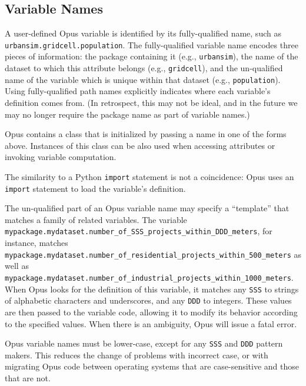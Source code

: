 {\subsection{Variable Names}
\label{sec:variable-names}
\variablesindex

A user-defined Opus variable \variablesindex is identified by its
fully-qualified name, such as \verb|urbansim.gridcell.population|.  The
fully-qualified variable \variablesindex name encodes three pieces of
information: the package containing it (e.g., \verb|urbansim|), the name of
the dataset \datasetindex to which this attribute \attributesindex belongs
(e.g., \verb|gridcell|), and the un-qualified name of the variable
\variablesindex which is unique within that dataset \datasetindex (e.g.,
\verb|population|).  Using fully-qualified path names explicitly indicates where
each variable's definition comes from.  (In retrospect, this may not be
ideal, and in the future we may no longer require the package name as part
of variable names.)

Opus contains a class  \variablesindex that is initialized by passing a
name in one of the forms above. Instances of this class can be also used when
accessing attributes \attributesindex or invoking variable \variablesindex computation.

The similarity to a Python \pythonindex \verb|import| statement is not a
coincidence: Opus uses an \verb|import| statement to load the variable's
\variablesindex definition.

The un-qualified part of an Opus variable \variablesindex name may specify
a ``template'' that matches a family of related variables. \variablesindex
The variable \variablesindex
\verb|mypackage.mydataset.number_of_SSS_projects_within_DDD_meters|, for
instance, matches
\verb|mypackage.mydataset.number_of_residential_projects_within_500_meters|
as well as
\verb|mypackage.mydataset.number_of_industrial_projects_within_1000_meters|.
When Opus looks for the definition of this variable, \variablesindex it
matches any \verb|SSS| to strings of alphabetic characters and underscores,
and any \verb|DDD| to integers. These values are then passed to the
variable \variablesindex code, allowing it to modify its behavior according
to the specified values. When there is an ambiguity, Opus will issue a
fatal error.

Opus variable \variablesindex names must be lower-case, except for any
\verb|SSS| and \verb|DDD| pattern makers.  This reduces the change of
problems with incorrect case, or with migrating Opus code between operating
systems that are case-sensitive and those that are not.

}
